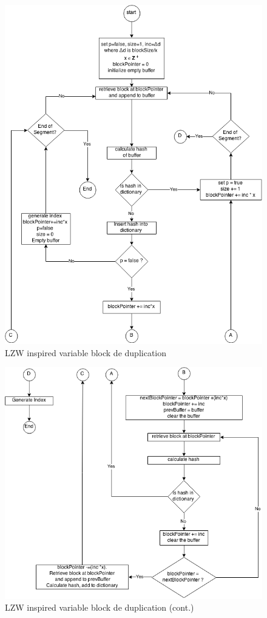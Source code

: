 \documentclass{article}
\begin{document}
  \begin{figure}[h]
   \centering
    \includegraphics[scale=0.5]{deDup1.png}
    \caption{LZW inspired variable block de duplication}
   \end{figure}
   \begin{figure}
   \centering
    \includegraphics[scale=0.5]{deDup2.png}
    \caption{LZW inspired variable block de duplication (cont.)}
   \end{figure}
  
\end{document}
